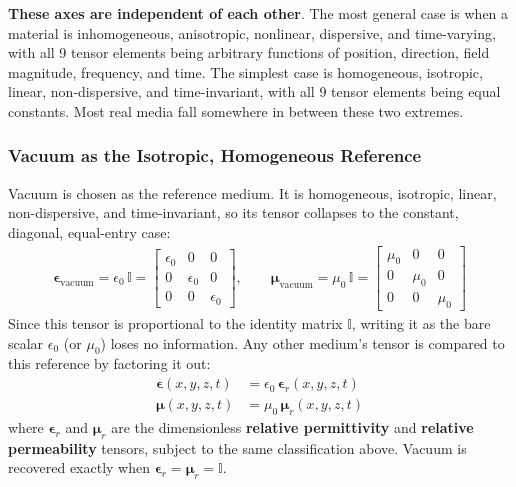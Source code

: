 \textbf{These axes are independent of each other}. The most general case is when a material
is inhomogeneous, anisotropic, nonlinear, dispersive, and time-varying, with all 9
tensor elements being arbitrary functions of position, direction, field magnitude,
frequency, and time. The simplest case is homogeneous, isotropic, linear,
non-dispersive, and time-invariant, with all 9 tensor elements being equal constants.
Most real media fall somewhere in between these two extremes.

\subsubsection{Vacuum as the Isotropic, Homogeneous Reference}

Vacuum is chosen as the reference medium. It is homogeneous, isotropic,
linear, non-dispersive, and time-invariant, so its tensor collapses
to the constant, diagonal, equal-entry case:
\begin{align*}
  \boldsymbol{\epsilon}_{\text{vacuum}} = \epsilon_0 \, \mathbb{I} = \begin{bmatrix}
    \epsilon_0 & 0 & 0 \\ 0 & \epsilon_0 & 0 \\ 0 & 0 & \epsilon_0
  \end{bmatrix}, \qquad
  \boldsymbol{\mu}_{\text{vacuum}} = \mu_0 \, \mathbb{I} = \begin{bmatrix}
    \mu_0 & 0 & 0 \\ 0 & \mu_0 & 0 \\ 0 & 0 & \mu_0
  \end{bmatrix}
\end{align*}
Since this tensor is proportional to the identity matrix \( \mathbb{I} \),
writing it as the bare scalar \( \epsilon_0 \) (or \( \mu_0 \)) loses no
information. Any other medium's tensor is compared to this reference by
factoring it out:
\begin{align*}
  \boldsymbol{\epsilon}(x,y,z,t) &= \epsilon_0 \, \boldsymbol{\epsilon}_r(x,y,z,t) \\
  \boldsymbol{\mu}(x,y,z,t) &= \mu_0 \, \boldsymbol{\mu}_r(x,y,z,t)
\end{align*}
where \( \boldsymbol{\epsilon}_r \) and \( \boldsymbol{\mu}_r \) are the
dimensionless \textbf{relative permittivity} and \textbf{relative
permeability} tensors, subject to the same classification above. Vacuum is
recovered exactly when \( \boldsymbol{\epsilon}_r = \boldsymbol{\mu}_r =
\mathbb{I} \).

